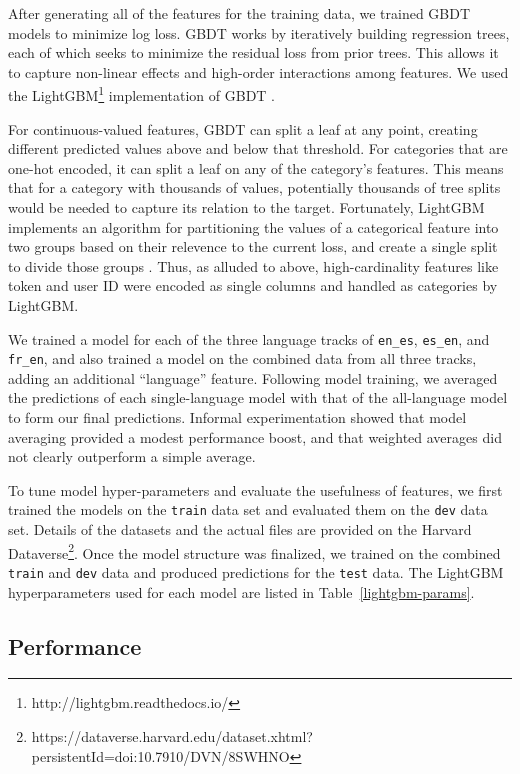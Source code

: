 \documentclass[11pt,a4paper]{article}
\begin{document}
After generating all of the features for the training data, we trained GBDT models to minimize log loss. GBDT works by
iteratively building regression trees, each of which seeks to minimize the
residual loss from prior trees. This allows it to capture non-linear effects
and high-order interactions among features. We used the LightGBM\footnote{http://lightgbm.readthedocs.io/} implementation
of GBDT \cite{ke2017lightgbm}.

For continuous-valued features, GBDT can split a leaf at any point, creating
different predicted values above and below that threshold. For categories that
are one-hot encoded, it can split a leaf on any of the category's features. This
means that for a category with thousands of values, potentially thousands of
tree splits would be needed to capture its relation to the target. Fortunately,
LightGBM implements an algorithm for partitioning the values of a categorical
feature into two groups based on their relevence to the current loss, and create
a single split to divide those groups \cite{fisher1958grouping}. Thus, as
alluded to above, high-cardinality features like token and user ID were encoded as
single columns and handled as categories by LightGBM.

We trained a model for each of the three language tracks of {\tt en\_es}, {\tt es\_en},
and {\tt fr\_en}, and also trained a model on the combined data from
all three tracks, adding an additional ``language'' feature. Following model
training, we averaged the predictions of each single-language model with that of
the all-language model to form our final predictions. Informal experimentation
showed that model averaging provided a modest performance boost, and that
weighted averages did not clearly outperform a simple average.

To tune model hyper-parameters and evaluate the usefulness of features, we first
trained the models on the {\tt train} data set and evaluated them on the {\tt dev}
data set. Details of the datasets and the actual files are provided on the
Harvard Dataverse\footnote{https://dataverse.harvard.edu/dataset.xhtml?persistentId=doi:10.7910/DVN/8SWHNO}.
Once the model structure was finalized, we trained on the combined
{\tt train} and {\tt dev} data and produced predictions for the {\tt test} data. The
LightGBM hyperparameters used for each model are listed in Table~\ref{lightgbm-params}.



\subsection{Performance}
\end{document}
